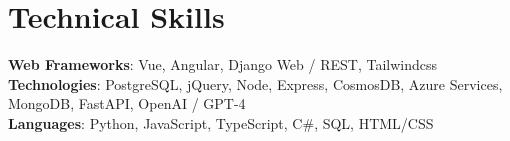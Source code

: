 \section{Technical Skills}
    \begin{itemize}[leftmargin=0.15in, label={}]
	\small{\item{
		\textbf{Web Frameworks}{: Vue, Angular, Django Web / REST, Tailwindcss} \\\vspace{0.5em}
		\textbf{Technologies}{: PostgreSQL, jQuery, Node, Express, CosmosDB, Azure Services, MongoDB, FastAPI, OpenAI / GPT-4} \\
        \vspace{0.5em}
		\textbf{Languages}{: Python, JavaScript, TypeScript, C\#, SQL, HTML/CSS} \\
	}}
    \end{itemize}